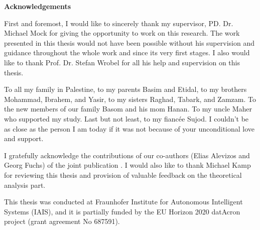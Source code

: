 

	\thispagestyle{empty}
{\noindent%
	\huge{\textbf{\textsf{Acknowledgements}}}
}
\vspace{2cm}
\begin{flushleft}
	\noindent%

\justify
\par First and foremost, I would like to sincerely thank my supervisor, PD. Dr. Michael Mock for giving the opportunity to work on this research. The work presented in this thesis would not have been possible without his supervision and guidance throughout the whole work and since its very first stages. I also would like to thank Prof. Dr. Stefan Wrobel for all his help and supervision on this thesis. 

\justify
\par To all my family in Palestine, to my parents Basim and Etidal, to my brothers Mohammad, Ibrahem, and Yasir, to my sisters Raghad, Tabark, and Zamzam. To the new members of our family Basom and his mom Hanan. To my uncle Maher who supported my study. Last but not least, to my fiancée Sujod. I couldn't be as close as the person I am today if it was not because of your unconditional love and support. 

\justify
\par I gratefully acknowledge the contributions of our co-authors (Elias Alevizos and Georg Fuchs) of the joint publication \cite{Qadah}. I would also like to thank  Michael Kamp for reviewing this thesis and provision of valuable feedback on the theoretical analysis part.
\justify
\par This thesis was conducted at Fraunhofer Institute for Autonomous Intelligent Systems (IAIS), and it is partially funded by the EU Horizon 2020 datAcron project (grant agreement No 687591).

	
	
\end{flushleft}

